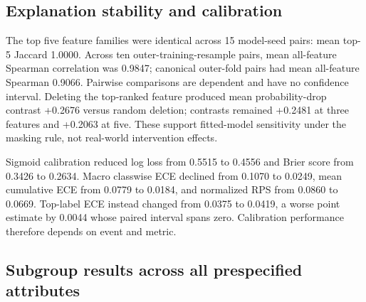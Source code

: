 \documentclass[information,article,submit,pdftex,moreauthors]{Definitions/mdpi}
\begin{document}
\subsection{Explanation stability and calibration}

The top five feature families were identical across 15 model-seed pairs: mean top-5 Jaccard 1.0000. Across ten outer-training-resample pairs, mean all-feature Spearman correlation was 0.9847; canonical outer-fold pairs had mean all-feature Spearman 0.9066. Pairwise comparisons are dependent and have no confidence interval. Deleting the top-ranked feature produced mean probability-drop contrast +0.2676 versus random deletion; contrasts remained +0.2481 at three features and +0.2063 at five. These support fitted-model sensitivity under the masking rule, not real-world intervention effects.

Sigmoid calibration reduced log loss from 0.5515 to 0.4556 and Brier score from 0.3426 to 0.2634. Macro classwise ECE declined from 0.1070 to 0.0249, mean cumulative ECE from 0.0779 to 0.0184, and normalized RPS from 0.0860 to 0.0669. Top-label ECE instead changed from 0.0375 to 0.0419, a worse point estimate by 0.0044 whose paired interval spans zero. Calibration performance therefore depends on event and metric.

\begin{table}[H]
\centering\scriptsize
\caption{SHAP and probability-quality diagnostics}
\label{tab:7}
\end{table}

\subsection{Subgroup results across all prespecified attributes}
\end{document}
